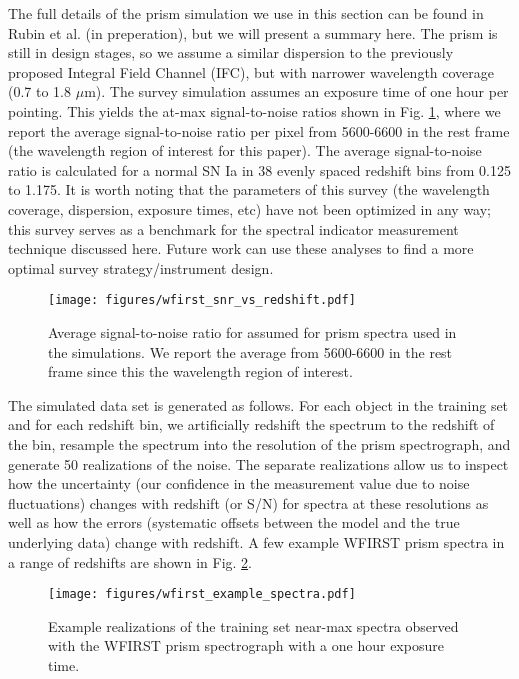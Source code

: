 The full details of the prism simulation we use in this section can be found in Rubin et al. (in preperation), but we will present a summary here. The prism is still in design stages, so we assume a similar dispersion to the previously proposed Integral Field Channel (IFC), but with narrower wavelength coverage (0.7 to 1.8 $\mu$m). The survey simulation assumes an exposure time of one hour per pointing. This yields the at-max signal-to-noise ratios shown in Fig. \ref{snr_wfirst_prism}, where we report the average signal-to-noise ratio per pixel from 5600-6600 \angstrom\; in the rest frame (the wavelength region of interest for this paper). The average signal-to-noise ratio is calculated for a normal SN Ia in 38 evenly spaced redshift bins from 0.125 to 1.175. It is worth noting that the parameters of this survey (the wavelength coverage, dispersion, exposure times, etc) have not been optimized in any way; this survey serves as a benchmark for the spectral indicator measurement technique discussed here. Future work can use these analyses to find a more optimal survey strategy/instrument design.

\begin{figure}[!htb]
    \centering
    \texttt{[image: figures/wfirst\_snr\_vs\_redshift.pdf]}
    \caption{Average signal-to-noise ratio for assumed for prism spectra used in the simulations. We report the average from 5600-6600 \angstrom\; in the rest frame since this the wavelength region of interest.}
    \label{snr_wfirst_prism}
\end{figure}

The simulated data set is generated as follows. For each object in the training set and for each redshift bin, we artificially redshift the spectrum to the redshift of the bin, resample the spectrum into the resolution of the prism spectrograph, and generate 50 realizations of the noise. The separate realizations allow us to inspect how the uncertainty (our confidence in the measurement value due to noise fluctuations) changes with redshift (or S/N) for spectra at these resolutions as well as how the errors (systematic offsets between the model and the true underlying data) change with redshift. A few example WFIRST prism spectra in a range of redshifts are shown in Fig. \ref{wfirst_example_spectra}.

\begin{figure}[!htb]
    \centering
    \texttt{[image: figures/wfirst\_example\_spectra.pdf]}
    \caption{Example realizations of the training set near-max spectra observed with the WFIRST prism spectrograph with a one hour exposure time.}
    \label{wfirst_example_spectra}
\end{figure}

